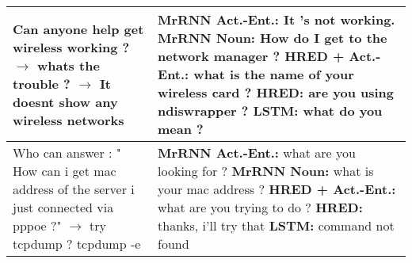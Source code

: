 \documentclass{article}
\begin{document}
\begin{table}[ht]
\begin{tabular}{p{65mm}|p{60mm}}
        Can anyone help get wireless working ? $\rightarrow$ whats the trouble ? $\rightarrow$ It doesnt show any wireless networks & \textbf{MrRNN Act.\@ -Ent.\@:} It 's not working. \newline \textbf{MrRNN Noun:} How do I get to the network manager ? \newline \textbf{HRED + Act.\@-Ent.\@:} what is the name of your wireless card ? \newline \textbf{HRED:} are you using ndiswrapper ? \newline \textbf{LSTM:} what do you mean ? \\ \hline 
        Who can answer : " How can i get mac address of the server i just connected via pppoe ?" $\rightarrow$ try tcpdump ? tcpdump -e & \textbf{MrRNN Act.\@ -Ent.\@:} what are you looking for ? \newline \textbf{MrRNN Noun:} what is your mac address ? \newline \textbf{HRED + Act.\@-Ent.\@:} what are you trying to do ? \newline \textbf{HRED:} thanks, i'll try that \newline \textbf{LSTM:} command not found \\ \hline
 \end{tabular}
\end{table}
\end{document}
